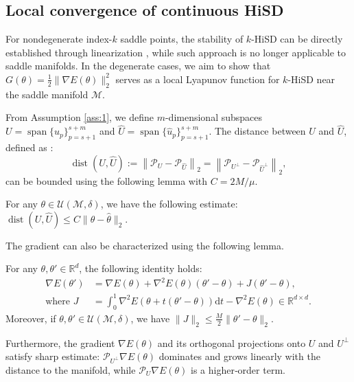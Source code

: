 \documentclass[final]{siamart251216}
\begin{document}
\subsection{Local convergence of continuous HiSD}
For nondegenerate index-$k$ saddle points, the stability of $k$-HiSD can be directly established through linearization \cite{yin2019high}, while such approach is no longer applicable to saddle manifolds.
In the degenerate cases, we aim to show that $G(\theta)=\frac{1}{2}\|\nabla E(\theta)\|_2^2$ serves as a local Lyapunov function for $k$-HiSD near the saddle manifold $\mathcal{M}$. 

From Assumption \ref{ass:1}, we define $m$-dimensional subspaces $U = \operatorname{span}\{u_p\}_{p=s+1}^{s+m}$ and $\widehat{U} = \operatorname{span}\{\hat{u}_p\}_{p=s+1}^{s+m}$.
The distance between $U$ and $\widehat{U}$, defined as \cite{golub2013matrix}:
\begin{equation}\label{eqn:projdist}
\operatorname{dist}(U, {\widehat{U}}):=
\left\|\mathcal{P}_{U} - \mathcal{P}_{\widehat{U}}\right\|_2= 
\left\|\mathcal{P}_{{U^\perp}} - \mathcal{P}_{\widehat{U}^\perp}\right\|_2,
\end{equation}
can be bounded using the following lemma with $C=2M/\mu$. 
\begin{lemma}
\label{lemma:dist}
For any $\theta \in \mathcal{U}(\mathcal{M}, \delta)$, we have the following estimate: $\operatorname{dist}(U, \widehat{U}) \leqslant C \|\theta-\hat{\theta}\|_2$. 
\end{lemma}
The gradient can also be characterized using the following lemma.
\begin{lemma} \label{lemma:expansion}
For any $\theta, \theta' \in \mathbb{R}^{d}$, the following identity holds:
\begin{align*}
\nabla E(\theta')&=\nabla E(\theta)+\nabla^{2}E(\theta)(\theta'-\theta)+J(\theta'-\theta),\\
\text{where }
J&= \int_0^1 \nabla^2 E\left(\theta+t(\theta'-\theta)\right)\mathrm{d}t - \nabla^2 E(\theta) \in \mathbb{R}^{d\times d}.
\end{align*}
Moreover, if $\theta, \theta' \in \mathcal{U}(\mathcal{M},\delta)$, we have $\|J\|_2\leqslant \frac{M}{2} \|\theta'-\theta\|_2$.
\end{lemma}
\noindent Furthermore, the gradient $\nabla E(\theta)$ and its orthogonal projections onto $U$ and $U^\perp$ satisfy sharp estimate:  
$\mathcal{P}_{U^\perp}\nabla E(\theta)$ dominates and grows linearly with the distance to the manifold, while $\mathcal{P}_{U}\nabla E(\theta)$ is a higher‐order term.
\end{document}
